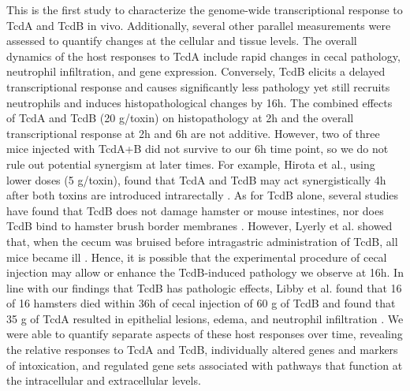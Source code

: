 This is the first study to characterize the genome-wide transcriptional 
response to TcdA and TcdB in vivo. Additionally, several other parallel 
measurements were assessed to quantify changes at the cellular and 
tissue levels. The overall dynamics of the host responses to TcdA 
include rapid changes in cecal pathology, neutrophil infiltration, 
and gene expression. Conversely, TcdB elicits a delayed 
transcriptional response and causes significantly less pathology 
yet still recruits neutrophils and induces histopathological 
changes by 16h. The combined effects of TcdA and TcdB 
(20 \textmugreek{}g/toxin) on histopathology at 2h and the overall 
transcriptional response at 2h and 6h are not additive. 
However, two of three mice injected with TcdA+B did not 
survive to our 6h time point, so we do not rule out potential 
synergism at later times. For example, Hirota et al., using 
lower doses (5 \textmugreek{}g/toxin), found that TcdA and TcdB may act 
synergistically 4h after both toxins are introduced intrarectally 
\cite{Hirota:2012gx}. As for TcdB alone, several studies have 
found that TcdB does not damage hamster or mouse intestines, nor 
does TcdB bind to hamster brush border membranes 
\cite{Lyerly:1985dx,Rolfe:1991vx}. However, Lyerly et al. 
showed that, when the cecum was bruised before intragastric 
administration of TcdB, all mice became ill \cite{Lyerly:1985dx}. 
Hence, it is possible that the experimental procedure of cecal 
injection may allow or enhance the TcdB-induced pathology we 
observe at 16h. In line with our findings that TcdB has pathologic 
effects, Libby et al. found that 16 of 16 hamsters died within 36h 
of cecal injection of 60 \textmugreek{}g of TcdB and found that 35 \textmugreek{}g of TcdA 
resulted in epithelial lesions, edema, and neutrophil 
infiltration \cite{Libby:1982wm}. We were able to quantify separate 
aspects of these host responses over time, revealing the 
relative responses to TcdA and TcdB, individually altered 
genes and markers of intoxication, and regulated gene sets 
associated with pathways that function at the intracellular 
and extracellular levels.

